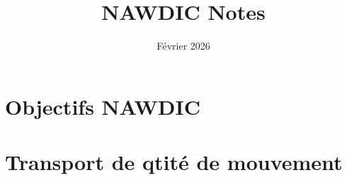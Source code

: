 
%



	

\title{NAWDIC Notes}
\date{Février 2026}

\maketitle
		
\section{Objectifs NAWDIC}

\section{Transport de qtité de mouvement}
	
		

